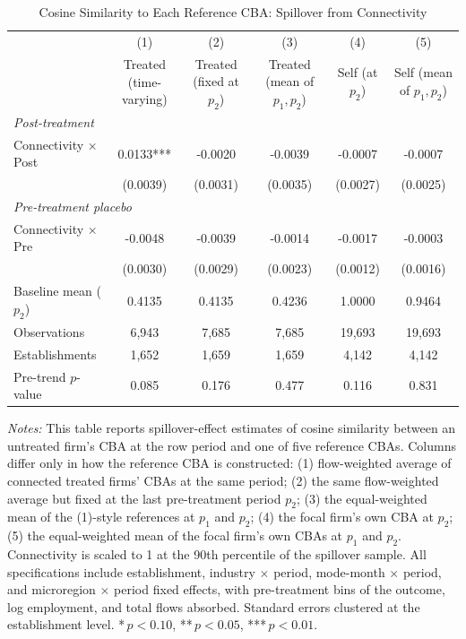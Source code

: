 \begin{table}[H]
\centering
\caption{Cosine Similarity to Each Reference CBA: Spillover from Connectivity}
\label{tab:cba_sim_multi_ref_cosine}
\scriptsize
\setlength{\tabcolsep}{6pt}
\begin{tabular}{lccccc}
\hline\hline
 & (1) & (2) & (3) & (4) & (5) \\
 & \shortstack{Treated\\(time-varying)} & \shortstack{Treated\\(fixed at $p_2$)} & \shortstack{Treated\\(mean of $p_1, p_2$)} & \shortstack{Self\\(at $p_2$)} & \shortstack{Self\\(mean of $p_1, p_2$)} \\
\hline
\multicolumn{6}{l}{\textit{Post-treatment}} \\
Connectivity $\times$ Post & 0.0133*** & -0.0020 & -0.0039 & -0.0007 & -0.0007 \\
 & (0.0039) & (0.0031) & (0.0035) & (0.0027) & (0.0025) \\
\multicolumn{6}{l}{\textit{Pre-treatment placebo}} \\
Connectivity $\times$ Pre & -0.0048 & -0.0039 & -0.0014 & -0.0017 & -0.0003 \\
 & (0.0030) & (0.0029) & (0.0023) & (0.0012) & (0.0016) \\
\hline
Baseline mean ($p_2$) & 0.4135 & 0.4135 & 0.4236 & 1.0000 & 0.9464 \\
Observations & 6,943 & 7,685 & 7,685 & 19,693 & 19,693 \\
Establishments & 1,652 & 1,659 & 1,659 & 4,142 & 4,142 \\
Pre-trend $p$-value & 0.085 & 0.176 & 0.477 & 0.116 & 0.831 \\
\hline\hline
\end{tabular}
\begin{minipage}{\linewidth}
\smallskip
\scriptsize\textit{Notes:} This table reports spillover-effect estimates of cosine similarity between an untreated firm's CBA at the row period and one of five reference CBAs. Columns differ only in how the reference CBA is constructed: (1) flow-weighted average of connected treated firms' CBAs at the same period; (2) the same flow-weighted average but fixed at the last pre-treatment period $p_2$; (3) the equal-weighted mean of the (1)-style references at $p_1$ and $p_2$; (4) the focal firm's own CBA at $p_2$; (5) the equal-weighted mean of the focal firm's own CBAs at $p_1$ and $p_2$. Connectivity is scaled to 1 at the 90th percentile of the spillover sample. All specifications include establishment, industry $\times$ period, mode-month $\times$ period, and microregion $\times$ period fixed effects, with pre-treatment bins of the outcome, log employment, and total flows absorbed. Standard errors clustered at the establishment level. *\,$p<0.10$, **\,$p<0.05$, ***\,$p<0.01$.
\end{minipage}
\end{table}

